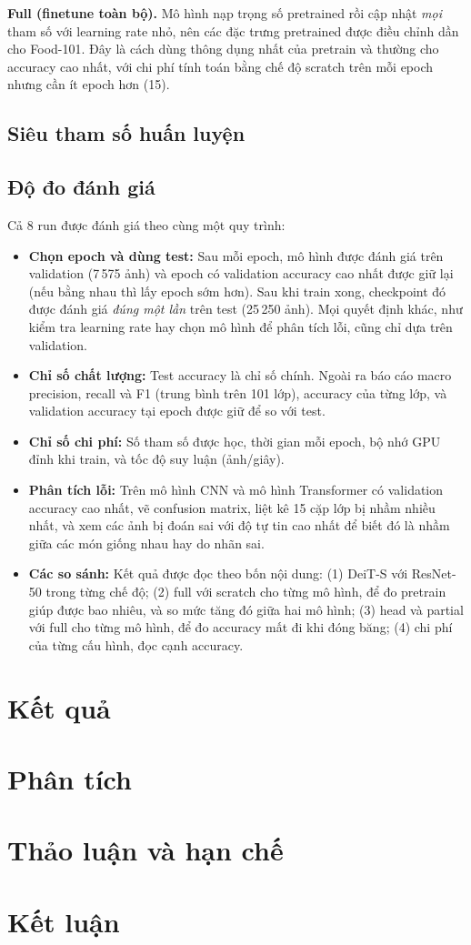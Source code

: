 \documentclass[a4paper,12pt]{article}
\begin{document}
\textbf{Full (finetune toàn bộ).} Mô hình nạp trọng số pretrained rồi cập nhật \emph{mọi} tham số với learning rate nhỏ, nên các đặc trưng pretrained được điều chỉnh dần cho Food-101. Đây là cách dùng thông dụng nhất của pretrain và thường cho accuracy cao nhất, với chi phí tính toán bằng chế độ scratch trên mỗi epoch nhưng cần ít epoch hơn (15).

\FloatBarrier

\subsection{Siêu tham số huấn luyện}

\subsection{Độ đo đánh giá}\label{sec:a1-eval}
Cả 8 run được đánh giá theo cùng một quy trình:
\begin{itemize}
    \item \textbf{Chọn epoch và dùng test:} Sau mỗi epoch, mô hình được đánh giá trên validation (7\,575 ảnh) và epoch có validation accuracy cao nhất được giữ lại (nếu bằng nhau thì lấy epoch sớm hơn). Sau khi train xong, checkpoint đó được đánh giá \emph{đúng một lần} trên test (25\,250 ảnh). Mọi quyết định khác, như kiểm tra learning rate hay chọn mô hình để phân tích lỗi, cũng chỉ dựa trên validation.
    \item \textbf{Chỉ số chất lượng:} Test accuracy là chỉ số chính. Ngoài ra báo cáo macro precision, recall và F1 (trung bình trên 101 lớp), accuracy của từng lớp, và validation accuracy tại epoch được giữ để so với test.
    \item \textbf{Chỉ số chi phí:} Số tham số được học, thời gian mỗi epoch, bộ nhớ GPU đỉnh khi train, và tốc độ suy luận (ảnh/giây).
    \item \textbf{Phân tích lỗi:} Trên mô hình CNN và mô hình Transformer có validation accuracy cao nhất, vẽ confusion matrix, liệt kê 15 cặp lớp bị nhầm nhiều nhất, và xem các ảnh bị đoán sai với độ tự tin cao nhất để biết đó là nhầm giữa các món giống nhau hay do nhãn sai.
    \item \textbf{Các so sánh:} Kết quả được đọc theo bốn nội dung: (1) DeiT-S với ResNet-50 trong từng chế độ; (2) full với scratch cho từng mô hình, để đo pretrain giúp được bao nhiêu, và so mức tăng đó giữa hai mô hình; (3) head và partial với full cho từng mô hình, để đo accuracy mất đi khi đóng băng; (4) chi phí của từng cấu hình, đọc cạnh accuracy.
\end{itemize}

\section{Kết quả}

\section{Phân tích}

\section{Thảo luận và hạn chế}

\section{Kết luận}



\end{document}
